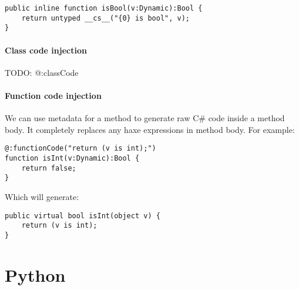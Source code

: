 \begin{lstlisting}
public inline function isBool(v:Dynamic):Bool {
    return untyped __cs__("{0} is bool", v);
}
\end{lstlisting}

\paragraph{Class code injection}

TODO: @:classCode

\paragraph{Function code injection}

We can use  metadata for a method to generate raw C# code inside a method body. It completely replaces any haxe expressions in method body. For example:

\begin{lstlisting}
@:functionCode("return (v is int);")
function isInt(v:Dynamic):Bool {
    return false;
}
\end{lstlisting}

Which will generate:

\begin{lstlisting}
public virtual bool isInt(object v) {
    return (v is int);
}
\end{lstlisting}


\section{Python}
\label{target-python}
